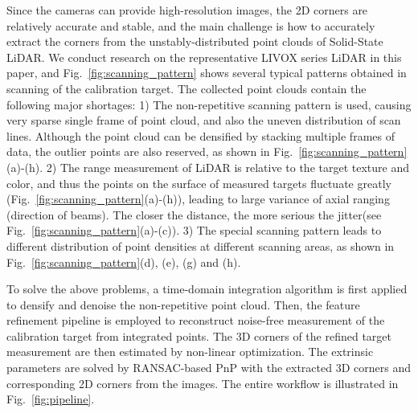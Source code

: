 \documentclass[journal]{vgtc}
\begin{document}
Since the cameras can provide high-resolution images, the 2D corners are relatively accurate and stable, and the main challenge is how to accurately extract the corners from the unstably-distributed point clouds of Solid-State LiDAR. We conduct research on the representative LIVOX series LiDAR in this paper, and Fig.~\ref{fig:scanning_pattern} shows several typical patterns obtained in scanning of the calibration target. The collected point clouds contain the following major shortages: 1) The non-repetitive scanning pattern is used, causing very sparse single frame of point cloud, and also the uneven distribution of scan lines. Although the point cloud can be densified by stacking multiple frames of data, the outlier points are also reserved, as shown in Fig.~\ref{fig:scanning_pattern}(a)-(h). 2) The range measurement of LiDAR is relative to the target texture and color, and thus the points on the surface of measured targets fluctuate greatly (Fig.~\ref{fig:scanning_pattern}(a)-(h)), leading to large variance of axial ranging (direction of beams). The closer the distance, the more serious the jitter(see Fig.~\ref{fig:scanning_pattern}(a)-(c)). 3) The special scanning pattern leads to different distribution of point densities at different scanning areas, as shown in Fig.~\ref{fig:scanning_pattern}(d), (e), (g) and (h).

To solve the above problems, a time-domain integration algorithm is first applied to densify and denoise the non-repetitive point cloud. Then, the feature refinement pipeline is employed to reconstruct noise-free measurement of the calibration target from integrated points. The 3D corners of the refined target measurement are then estimated by non-linear optimization. The extrinsic parameters are solved by RANSAC-based PnP with the extracted 3D corners and corresponding 2D corners from the images. The entire workflow is illustrated in Fig.~\ref{fig:pipeline}.
\end{document}

